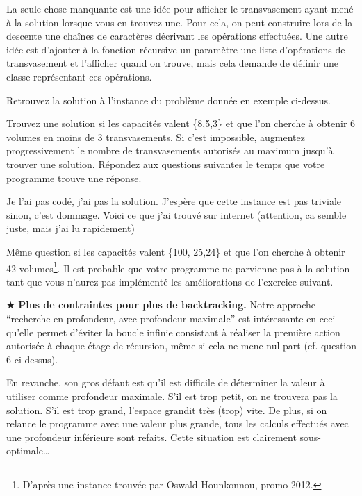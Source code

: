 \documentclass[10pt]{article}\usepackage[correction,nu]{esial}%
\begin{document}
La seule chose manquante est une idée pour afficher le transvasement ayant mené
à la solution lorsque vous en trouvez une. Pour cela, on peut construire lors
de la descente une chaînes de caractères décrivant les opérations
effectuées. Une autre idée est d'ajouter à la fonction récursive un paramètre
une liste d'opérations de transvasement et l'afficher quand on trouve, mais
cela demande de définir une classe représentant ces opérations.

\Question Retrouvez la solution à l'instance du problème donnée en exemple
ci-dessus. 

\Question Trouvez une solution si les capacités valent \{8,5,3\} et
que l'on cherche à obtenir 6 volumes en moins de 3 transvasements. Si
c'est impossible, augmentez progressivement le nombre de
transvasements autorisés au maximum jusqu'à trouver une solution.
Répondez aux questions suivantes le temps que votre programme trouve
une réponse.

\begin{Reponse}
  Je l'ai pas codé, j'ai pas la solution. J'espère que cette instance est pas
  triviale sinon, c'est dommage. Voici ce que j'ai trouvé sur internet
  (attention, ca semble juste, mais j'ai lu rapidement)

\end{Reponse}

\Question Même question si les capacités valent \{100, 25,24\} et que
l'on cherche à obtenir 42 volumes\footnote{D'après une instance
trouvée par Oswald Hounkonnou, promo 2012.}. Il est probable que votre
programme ne parvienne pas à la solution tant que vous n'aurez pas
implémenté les améliorations de l'exercice suivant.


\smallskip\noindent\setcounter{Question}{0}\hspace{-1.3em}$\bigstar$
\textbf{Plus de contraintes pour plus de backtracking.} Notre approche
``recherche en profondeur, avec profondeur maximale'' est intéressante en ceci
qu'elle permet d'éviter la boucle infinie consistant à réaliser la première
action autorisée à chaque étage de récursion, même si cela ne mene nul part
(cf. question 6 ci-dessus).

En revanche, son gros défaut est qu'il est difficile de déterminer la valeur à
utiliser comme profondeur maximale. S'il est trop petit, on ne trouvera pas la
solution. S'il est trop grand, l'espace grandit très (trop) vite. De plus, si
on relance le programme avec une valeur plus grande, tous les calculs effectués
avec une profondeur inférieure sont refaits. Cette situation est clairement
sous-optimale\ldots
\end{document}
